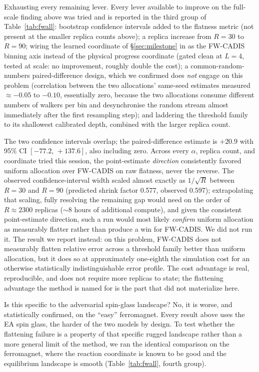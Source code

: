 \documentclass[a4paper,fleqn]{cas-sc}
\begin{document}
	Exhausting every remaining lever. Every lever available to improve on the full-scale
	finding above was tried and is reported in the third group of Table~\ref{tab:fwall}:
	bootstrap confidence
	intervals added to the flatness metric (not present at the smaller replica counts above); a
	replica increase from $R=30$ to $R=90$; wiring the learned coordinate of
	\S\ref{sec:milestone} in as the FW-CADIS binning axis instead of the physical progress
	coordinate (gated clean at $L=4$, tested at scale: no improvement, roughly double the
	cost); a common-random-numbers paired-difference design, which we confirmed does
	\emph{not} engage on this problem (correlation between the two allocations'
	same-seed estimates measured $\approx-0.05$ to $-0.10$, essentially zero, because the two
	allocations consume different numbers of walkers per bin and desynchronise the random
	stream almost immediately after the first resampling step); and laddering the threshold
	family to its shallowest calibrated depth, combined with the larger replica count.
	
	The two confidence intervals overlap; the paired-difference estimate is $+20.9$ with 95\%
	CI $[-77.2,\,+137.6]$, also including zero. Across every $\alpha$, replica count, and
	coordinate tried this session, the point-estimate \emph{direction} consistently favored
	uniform allocation over FW-CADIS on raw flatness, never the reverse. The observed
	confidence-interval width scaled almost exactly as $1/\sqrt{R}$ between $R=30$ and $R=90$
	(predicted shrink factor 0.577, observed 0.597); extrapolating that scaling, fully resolving
	the remaining gap would need on the order of $R\approx2300$ replicas ($\sim$8 hours of
	additional compute), and given the consistent point-estimate direction, such a run would
	most likely \emph{confirm} uniform allocation as measurably flatter rather than produce a
	win for FW-CADIS. We did not run it. The result we report instead: on this problem,
	FW-CADIS does not measurably flatten relative error across a threshold family better than
	uniform allocation, but it does so at approximately one-eighth the simulation cost for an
	otherwise statistically indistinguishable error profile. The cost advantage is real,
	reproducible, and does not require more replicas to state; the flattening advantage the
	method is named for is the part that did not materialize here.
	
	Is this specific to the adversarial spin-glass landscape? No, it is worse, and
	statistically confirmed, on the ``easy'' ferromagnet. Every result above uses the EA spin
	glass, the harder of the two models by design. To test whether the flattening failure is a
	property of that specific rugged landscape rather than a more general limit of the method,
	we ran the identical comparison on the ferromagnet, where the reaction coordinate is known
	to be good and the equilibrium landscape is smooth (Table~\ref{tab:fwall}, fourth group).
	
\end{document}
